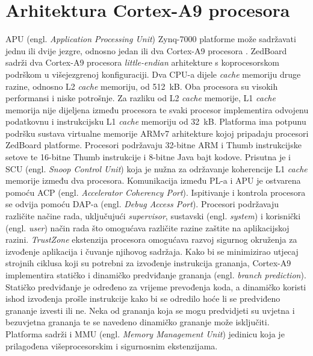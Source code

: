 \documentclass[times, utf8, diplomski, numeric]{fer}
\begin{document}
\chapter{Arhitektura Cortex-A9 procesora}
APU (engl. \textit{Application Processing Unit}) Zynq-7000 platforme može sadržavati jednu ili dvije jezgre, odnosno jedan
ili dva Cortex-A9 procesora \cite{zynq_trm}. ZedBoard sadrži dva Cortex-A9 procesora \textit{little-endian} arhitekture s
koprocesorskom podrškom u višejezgrenoj konfiguraciji. Dva CPU-a dijele \textit{cache} memoriju druge razine,
odnosno L2 \textit{cache} memoriju, od 512~kB.
Oba procesora su visokih performansi i niske potrošnje. Za razliku od L2 \textit{cache} memorije, L1 \textit{cache}
memorija nije dijeljena između procesora te svaki procesor implementira odvojenu podatkovnu i instrukcijsku
L1 \textit{cache} memoriju od 32~kB. Platforma ima potpunu podršku sustava virtualne memorije ARMv7 arhitekture kojoj
pripadaju procesori ZedBoard platforme. Procesori podržavaju 32-bitne ARM i Thumb instrukcijske setove te 16-bitne
Thumb instrukcije i 8-bitne Java bajt kodove. Prisutna je i SCU (engl. \textit{Snoop Control Unit}) koja je nužna za održavanje
koherencije L1 \textit{cache} memorije između dva procesora. Komunikacija između PL-a i APU je ostvarena
pomoću ACP (engl. \textit{Accelerator Coherency Port}). Ispitivanje i kontrola procesora se odvija pomoću DAP-a
(engl. \textit{Debug Access Port}). Procesori podržavaju različite načine rada, uključujući \textit{supervisor},
sustavski (engl. \textit{system}) i korisnički (engl. \textit{user}) način rada što omogućava različite razine
zaštite na aplikacijskoj razini. \textit{TrustZone} ekstenzija procesora omogućava razvoj sigurnog okruženja za
izvođenje aplikacija i čuvanje njihovog sadržaja. Kako bi se minimizirao utjecaj strojnih ciklusa koji su potrebni
za izvođenje instrukcija grananja, Cortex-A9 implementira statičko i dinamičko predviđanje grananja (engl.
\textit{branch prediction}). Statičko predviđanje je određeno za vrijeme prevođenja koda, a dinamičko koristi
ishod izvođenja prošle instrukcije kako bi se odredilo hoće li se predviđeno grananje izvesti ili ne. Neka od
grananja koja se mogu predvidjeti su uvjetna i bezuvjetna grananja te se navedeno dinamičko grananje može isključiti.
Platforma sadrži i MMU (engl. \textit{Memory Management Unit}) jedinicu koja je prilagođena višeprocesorskim i sigurnosnim
ekstenzijama.
\end{document}
